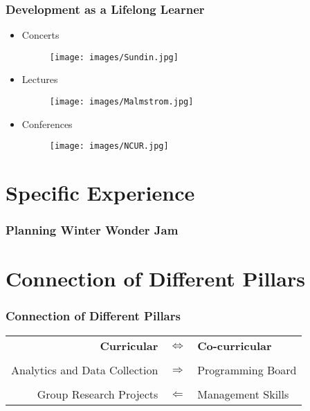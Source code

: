 \documentclass{beamer}
\begin{document}
\begin{frame}
\frametitle{Development as a Lifelong Learner}
\begin{itemize}
	\item Concerts
	\begin{figure}[htp]
		\texttt{[image: images/Sundin.jpg]}
	\end{figure}
	\item Lectures
	\begin{figure}[htp]
		\texttt{[image: images/Malmstrom.jpg]}
	\end{figure}
	\item Conferences
	\begin{figure}
		\texttt{[image: images/NCUR.jpg]}
	\end{figure}
\end{itemize}
\end{frame}

\section{Specific Experience}

\begin{frame}
\frametitle{Planning Winter Wonder Jam}
\begin{figure}[htp]
	\centering
	\quad
\end{figure}
\end{frame}


\section{Connection of Different Pillars}

\begin{frame}
\frametitle{Connection of Different Pillars}
\begin{table}
\begin{tabular}{rcl}
	\textbf{Curricular} & $\iff$ & \textbf{Co-curricular} \\
	&&\\
	Analytics and Data Collection & $\Longrightarrow$ & Programming Board \\
	&&\\
	Group Research Projects & $\Longleftarrow$ & Management Skills
\end{tabular}
\end{table}

\end{frame}
\end{document}
